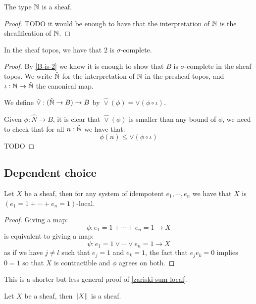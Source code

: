 \begin{lemma}\label{N-sheaf-sigma-complete}
The type $\mathbb{N}$ is a sheaf.
\end{lemma}

\begin{proof}
TODO it would be enough to have that the interpretation of $\mathbb{N}$ is the sheafification of $\mathbb{N}$.
\end{proof}

\begin{theorem}[LPO]
In the sheaf topos, we have that $2$ is $\sigma$-complete.
\end{theorem}

\begin{proof}
By \cref{B-is-2} we know it is enough to show that $B$ is $\sigma$-complete in the sheaf topos. We write $\hat{\mathbb{N}}$ for the interpretation of $\mathbb{N}$ in the presheaf topos, and $\iota:\mathbb{N}\to\hat{\mathbb{N}}$ the canonical map.

We define $\hat{\lor} : (\hat{\mathbb{N}} \to B) \to B$ by $\hat{\lor}(\phi) = \lor(\phi\circ \iota)$.

Given $\phi : \hat{N}\to B$, it is clear that $\hat{\lor}(\phi)$ is smaller than any bound of $\phi$, we need to check that for all $n:\hat{\mathbb{N}}$ we have that:
\[\phi(n) \leq \lor(\phi\circ \iota)\]
TODO
\end{proof}

\subsection{Dependent choice}

\begin{lemma}
Let $X$ be a sheaf, then for any system of idempotent $e_1,\cdots, e_n$ we have that $X$ is $(e_1=1+\cdots+e_n=1)$-local.
\end{lemma}

\begin{proof}
Giving a map:
\[\phi:e_1=1+\cdots+e_n=1 \to X\] 
is equivalent to giving a map:
\[\psi:e_1=1\lor\cdots\lor e_n=1 \to X\]
as if we have $j\not=l$ such that $e_j=1$ and $e_k=1$, the fact that $e_je_k=0$ implies $0=1$ so that $X$ is contractible and $\phi$ agrees on both. 
\end{proof}

This is a shorter but less general proof of \cref{zariski-sum-local}.

\begin{lemma}\label{prop-trunc-sheaf-sigma-complete}
Let $X$ be a sheaf, then $\lVert X \rVert$ is a sheaf. 
\end{lemma}

